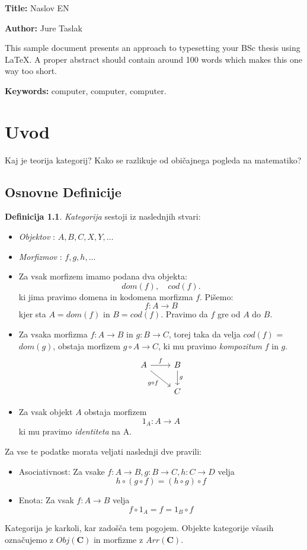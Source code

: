 \documentclass[12pt,a4paper]{book}
\newcommand{\ttitleEn}{Naslov EN}
\newcommand{\tauthor}{Jure Taslak}
\newcommand{\tkeywordsEn}{computer, computer, computer}
\newcommand{\clearemptydoublepage}{\newpage{\pagestyle{empty}\cleardoublepage}}
\theoremstyle{definition}
\newtheorem{definicija}{Definicija}[chapter]
\theoremstyle{plain}
\theoremstyle{definition}
\theoremstyle{remark}
\newcommand{\cat}[1]{\textbf{#1}}
\begin{document}
\noindent\textbf{Title:} \ttitleEn
\bigskip

\noindent\textbf{Author:} \tauthor
\bigskip

\noindent This sample document presents an approach to typesetting your BSc thesis using \LaTeX. 
A proper abstract should contain around 100 words which makes this one way too short.
\bigskip

\noindent\textbf{Keywords:} \tkeywordsEn.
\clearemptydoublepage

\mainmatter
\setcounter{page}{1}
\pagestyle{fancy}

\chapter{Uvod}
Kaj je teorija kategorij? Kako se razlikuje od običajnega pogleda na matematiko?

\section{Osnovne Definicije}

\begin{definicija}
\emph{Kategorija} sestoji iz naslednjih stvari:
\begin{itemize}
\item \emph{Objektov} : $A,B,C,X,Y,\ldots$
\item \emph{Morfizmov} : $f,g,h,\ldots$
\item Za vsak morfizem imamo podana dva objekta: $$dom(f), \quad cod(f).$$
ki jima pravimo domena in kodomena morfizma $f$. Pišemo:
$$f\colon A \to B$$
kjer sta $A = dom(f)$ in $B = cod(f)$.
Pravimo da $f$ gre od $A$ do $B$.
\item Za vsaka morfizma $f \colon A \to B$ in $g \colon B \to C$, torej taka da velja $cod(f)$ = $dom(g)$, obstaja morfizem $g\circ A \to C$, ki mu pravimo \emph{kompozitum} $f$ in $g$.
%
\[
\begin{tikzcd}
A \arrow[r, "f"] \arrow[rd, "g \circ f"']  & B  \arrow[d, "g"] \\
				& C
\end{tikzcd}
\] 
%
\item Za vsak objekt $A$ obstaja morfizem
$$1_A : A \to A$$
ki mu pravimo \emph{identiteta} na A.		
\end{itemize}
Za vse te podatke morata veljati naslednji dve pravili:
\begin{itemize}
\item Asociativnost: Za vsake $f : A \to B, g : B \to C, h : C \to D$ velja
$$h \circ (g \circ f) = (h \circ g) \circ f$$
\item Enota: Za vsak $f : A \to B$ velja
$$f \circ 1_A = f = 1_B \circ f$$
\end{itemize}
\end{definicija}
%
Kategorija je karkoli, kar zadošča tem pogojem.
Objekte kategorije všasih označujemo z $Obj(\cat{C})$ in morfizme z $Arr(\cat{C})$.
\end{document}
